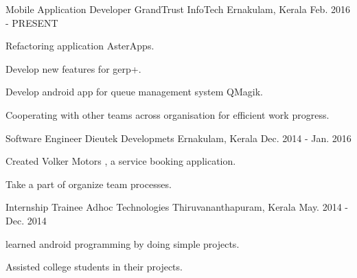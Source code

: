 

\begin{cventries}

  \cventry
    {Mobile Application Developer} %
    {GrandTrust InfoTech} %
    {Ernakulam, Kerala} %
    {Feb. 2016 - PRESENT} %
    {
      \begin{cvitems} %
        \item {Refactoring application AsterApps.}
        \item {Develop new features for gerp+.}
        \item {Develop android app for queue management system QMagik.}
        \item {Cooperating with other teams across organisation for efficient work progress.}
      \end{cvitems}
    }

  \cventry
    {Software Engineer} %
    {Dieutek Developmets} %
    {Ernakulam, Kerala} %
    {Dec. 2014 - Jan. 2016} %
    {
      \begin{cvitems} %
        \item {Created Volker Motors , a service booking application.}
        \item {Take a part of organize team processes.}
      \end{cvitems}
    }

  \cventry
    {Internship Trainee} %
    {Adhoc Technologies} %
    {Thiruvananthapuram, Kerala} %
    {May. 2014 - Dec. 2014} %
    {
      \begin{cvitems} %
        \item {learned android programming by doing simple projects.}
        \item {Assisted college students in their projects.}
      \end{cvitems}
    }

\end{cventries}
